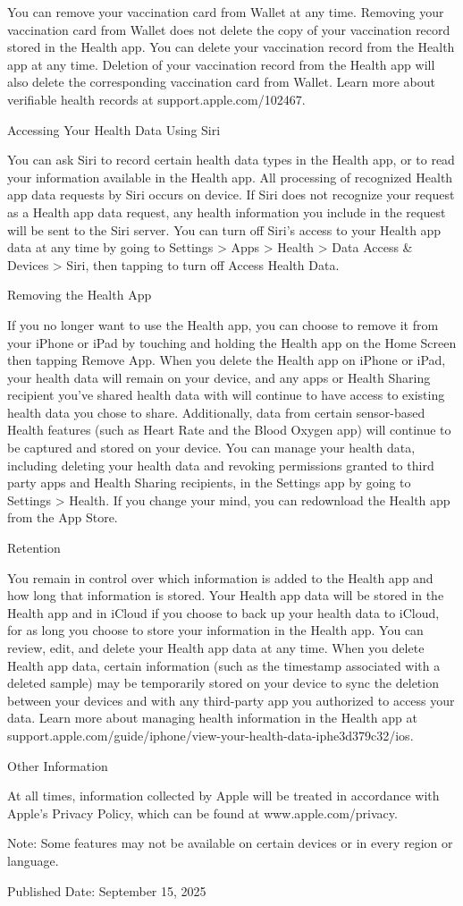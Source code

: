 You can remove your vaccination card from Wallet at any time. Removing your vaccination card from Wallet does not delete the copy of your vaccination record stored in the Health app. You can delete your vaccination record from the Health app at any time. Deletion of your vaccination record from the Health app will also delete the corresponding vaccination card from Wallet. Learn more about verifiable health records at support.apple.com/102467.

Accessing Your Health Data Using Siri

You can ask Siri to record certain health data types in the Health app, or to read your information available in the Health app. All processing of recognized Health app data requests by Siri occurs on device. If Siri does not recognize your request as a Health app data request, any health information you include in the request will be sent to the Siri server. You can turn off Siri’s access to your Health app data at any time by going to Settings > Apps > Health > Data Access & Devices > Siri, then tapping to turn off Access Health Data.

Removing the Health App

If you no longer want to use the Health app, you can choose to remove it from your iPhone or iPad by touching and holding the Health app on the Home Screen then tapping Remove App. When you delete the Health app on iPhone or iPad, your health data will remain on your device, and any apps or Health Sharing recipient you’ve shared health data with will continue to have access to existing health data you chose to share. Additionally, data from certain sensor-based Health features (such as Heart Rate and the Blood Oxygen app) will continue to be captured and stored on your device. You can manage your health data, including deleting your health data and revoking permissions granted to third party apps and Health Sharing recipients, in the Settings app by going to Settings > Health. If you change your mind, you can redownload the Health app from the App Store.

Retention

You remain in control over which information is added to the Health app and how long that information is stored. Your Health app data will be stored in the Health app and in iCloud if you choose to back up your health data to iCloud, for as long you choose to store your information in the Health app. You can review, edit, and delete your Health app data at any time. When you delete Health app data, certain information (such as the timestamp associated with a deleted sample) may be temporarily stored on your device to sync the deletion between your devices and with any third-party app you authorized to access your data. Learn more about managing health information in the Health app at support.apple.com/guide/iphone/view-your-health-data-iphe3d379c32/ios.

Other Information

At all times, information collected by Apple will be treated in accordance with Apple’s Privacy Policy, which can be found at www.apple.com/privacy.

Note: Some features may not be available on certain devices or in every region or language.

Published Date: September 15, 2025
